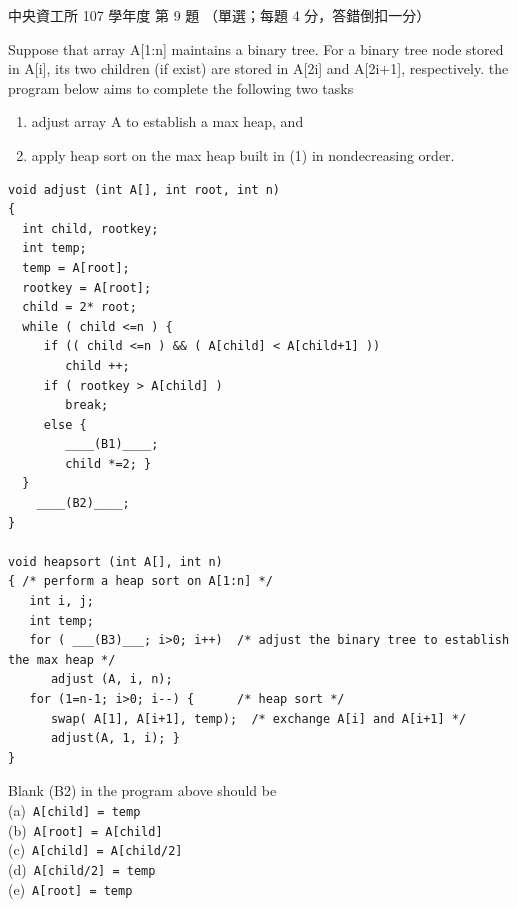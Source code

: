 \begin{pastexam}[label={px:ncu-107-dsa-09}]{中央資工所 107 學年度 第 9 題}
（單選；每題 4 分，答錯倒扣一分）

Suppose that array A[1:n] maintains a binary tree. For a binary tree node stored in A[i], its two
children (if exist) are stored in A[2i] and A[2i+1], respectively. the program below aims to
complete the following two tasks
\begin{enumerate}[label=(\arabic*)]
\item adjust array A to establish a max heap, and
\item apply heap sort on the max heap built in (1) in nondecreasing order.
\end{enumerate}
\begin{verbatim}
void adjust (int A[], int root, int n)
{
  int child, rootkey;
  int temp;
  temp = A[root];
  rootkey = A[root];
  child = 2* root;
  while ( child <=n ) {
     if (( child <=n ) && ( A[child] < A[child+1] ))
        child ++;
     if ( rootkey > A[child] )
        break;
     else {
        ____(B1)____;
        child *=2; }
  }
    ____(B2)____;
}

void heapsort (int A[], int n)
{ /* perform a heap sort on A[1:n] */
   int i, j;
   int temp;
   for ( ___(B3)___; i>0; i++)  /* adjust the binary tree to establish the max heap */
      adjust (A, i, n);
   for (1=n-1; i>0; i--) {      /* heap sort */
      swap( A[1], A[i+1], temp);  /* exchange A[i] and A[i+1] */
      adjust(A, 1, i); }
}
\end{verbatim}

Blank (B2) in the program above should be\\
(a)~\texttt{A[child] = temp}\\
(b)~\texttt{A[root] = A[child]}\\
(c)~\texttt{A[child] = A[child/2]}\\
(d)~\texttt{A[child/2] = temp}\\
(e)~\texttt{A[root] = temp}
\end{pastexam}

